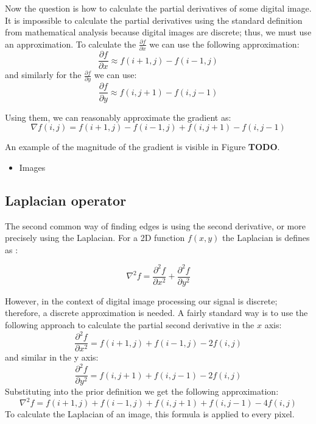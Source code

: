 \documentclass[
  digital,     %
  oneside,     %
  nosansbold,  %
  nocolorbold, %
  lof,         %
  lot,         %
]{fithesis4}
\begin{document}
Now the question is how to calculate the partial derivatives of some digital image.
It is impossible to calculate the partial derivatives using the standard
definition from mathematical analysis because digital images are discrete; thus,
we must use an approximation. To calculate the $\frac{\partial f}{\partial x}$
we can use the following approximation:
$$\frac{\partial f}{\partial x} \approx f(i+1,j)-f(i-1,j)$$
and similarly for the $\frac{\partial f}{\partial y}$ we can use:
$$\frac{\partial f}{\partial y} \approx f(i, j+1)-f(i,j-1)$$

Using them, we can reasonably approximate the gradient as:
$$\nabla f(i, j) = f(i+1,j) - f(i-1,j) + f(i,j+1) - f(i,j-1)$$

An example of the magnitude of the gradient is visible in Figure \textbf{TODO}.

\begin{itemize}
    \item Images
\end{itemize}

\subsection{Laplacian operator}

The second common way of finding edges is using the second derivative, or more
precisely using the Laplacian. For a 2D function $f(x, y)$ the Laplacian is
defines as \cite{gonzalez2002}:

$$\nabla^2 f = \frac{\partial^2 f}{\partial x^2} + \frac{\partial^2 f}{\partial y^2}$$

However, in the context of digital image processing our signal is discrete;
therefore, a discrete approximation is needed. A fairly standard way is to use
the following approach to calculate the partial second derivative in the $x$
axis:
$$\frac{\partial^2 f}{\partial x^2} = f(i + 1, j) + f(i - 1, j) - 2f(i, j)$$
and similar in the y axis:
$$\frac{\partial^2 f}{\partial y^2} = f(i, j + 1) + f(i, j - 1) - 2f(i, j)$$
Substituting into the prior definition we get the following approximation:
$$\nabla^2 f = f(i+1, j) + f(i-1, j) + f(i, j+1) + f(i, j-1) - 4f(i,j)$$
To calculate the Laplacian of an image, this formula is applied to every pixel.

\end{document}
